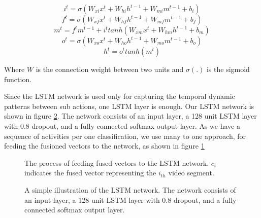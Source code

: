 \begin{equation}
i^{t} = \sigma (W_{xi}x^t + W_{hi}h^{t-1} + W_{mi}m^{t-1} + b_{i})
\end{equation}
\begin{equation}
f^{t} = \sigma (W_{xf}x^t + W_{hf}h^{t-1} + W_{mf}m^{t-1} + b_{f})
\end{equation}
\begin{equation}
m^{t} = f^tm^{t-1} + i^ttanh(W_{xm}x^t + W_{hm}h^{t-1} + b_{m})
\end{equation}
\begin{equation}
o^{t} = \sigma (W_{xo}x^t + W_{ho}h^{t-1} + W_{mo}m^{t-1} + b_{o})
\end{equation}
\begin{equation}
h^t = o^ttanh(m^t)
\end{equation}

Where $W$ is the connection weight between two units and $\sigma(.)$ is the sigmoid function.

Since the LSTM network is used only for capturing the temporal dynamic patterns between sub actions, one LSTM layer is enough.
Our LSTM network is shown in figure \ref{fi:layers}. The network consists of an input layer, a 128 unit LSTM layer with 0.8 dropout, and
a fully connected softmax output layer. As we have a sequence of activities per one classification, we use many to one approach,
for feeding the fusioned vectors to the network, as shown in figure \ref{fi:lstm}

\begin{figure}
  \centering
  
  \caption{The process of feeding fused vectors to the LSTM network. $c_{i}$ indicates the fused vector representing the $i_{th}$
  video segment.}\label{fi:lstm}
\end{figure}

\begin{figure}
  \centering
  
  \caption{A simple illustration of the LSTM network. The network consists of an input layer, a 128 unit LSTM layer with 0.8 dropout, and
a fully connected softmax output layer.}\label{fi:layers}
\end{figure}


